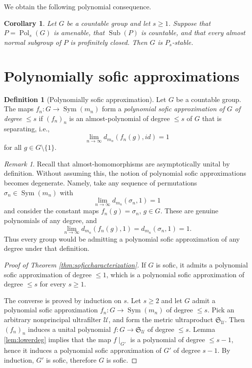 \documentclass[a4paper,12pt]{amsart}
\theoremstyle{plain}
\newtheorem{corollary}[subsection]{{\bf Corollary}}
\theoremstyle{definition}
\newtheorem*{definition}{{\bf Definition}}
\theoremstyle{remark}
\newtheorem{remark}[subsection]{{\it Remark}}
\numberwithin{equation}{subsection}
\DeclareMathOperator{\Sym}{Sym}
\DeclareMathOperator{\Sub}{Sub}
\DeclareMathOperator{\Pold}{Pol}
\begin{document}
We obtain the following polynomial consequence.

\begin{corollary}
\label{cor:AP-polynomial}
Let $G$ be a countable group and let $s\geq1$.  Suppose that
$P=\Pold_s(G)$
is amenable, that $\Sub(P)$ is countable, and that every almost normal subgroup of $P$ is profinitely closed.  Then $G$ is $P_s$-stable.
\end{corollary}


\section{Polynomially sofic approximations}
\label{s:polysoficapprox}

\noindent

\begin{definition}[Polynomially sofic approximation]
    Let $G$ be a countable group.
    The maps $f_n:G\to\Sym(m_n)$ form a \emph{polynomial sofic approximation of $G$ of degree $\le s$} if $(f_n)_n$ is an almost-polynomial of degree $\le s$ of $G$ that is separating, i.e., 
    $$\lim_{n\to\infty} d_{m_n}(f_n(g),id)=1$$
    for all $g\in G\setminus\{1\}$.
\end{definition}

\begin{remark}
    \label{rem:unitalsof}
    Recall that almost-homomorphisms are asymptotically unital by definition. Without assuming this, the notion of polynomial sofic approximations becomes degenerate. Namely, take any sequence of permutations $\sigma_n\in\Sym(m_n)$ with
    $$\lim_{n\to \infty }d_{m_n}(\sigma_n,1) =1$$
    and consider the constant maps
    $f_n(g)=\sigma_n$, $g\in G$. These are genuine polynomials of any degree, and
    $$\lim_{n\to\infty}d_{m_n}(f_n(g),1)=d_{m_n}(\sigma_n,1)=1.$$
    Thus every group would be admitting a polynomial sofic approximation of any degree under that definition.
\end{remark}

\begin{proof}[Proof of Theorem \ref{thm:soficcharacterization}]
    If $G$ is sofic, it admits a polynomial sofic approximation of degree $\le 1$, which is a polynomial sofic approximation of degree $\le s$ for every $s\ge 1$.

    The converse is proved by induction on $s$. Let $s\ge 2$ and let $G$ admit a polynomial sofic approximation $f_n:G\to\Sym(m_n)$ of degree $\le s$. Pick an arbitrary nonprincipal ultrafilter $\mathcal{U}$, and form the metric ultraproduct
    $\mathfrak{S}_{\mathcal{U}}$.
    Then $(f_n)_n$ induces a unital polynomial $f:G\to\mathfrak{S}_{\mathcal{U}}$ of degree $\le s$.
    Lemma \ref{lem:lowerdeg} implies that the map $f\mid_{G'}$ is a polynomial of degree $\le s-1$, hence it induces a polynomial sofic approximation of $G'$ of degree $s-1$. By induction, $G'$ is sofic, therefore $G$ is sofic.
\end{proof}
\end{document}
